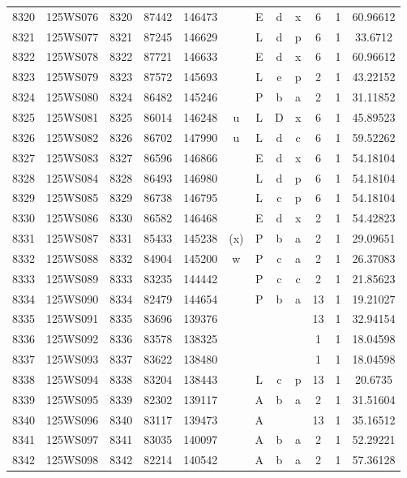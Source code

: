 \begin{tabular}{|*{12}{c|}}
8320 & 125WS076 & 8320 & 87442 & 146473 &  & E & d & x & 6 & 1 & 60.96612 \\ 
8321 & 125WS077 & 8321 & 87245 & 146629 &  & L & d & p & 6 & 1 & 33.6712 \\ 
8322 & 125WS078 & 8322 & 87721 & 146633 &  & E & d & x & 6 & 1 & 60.96612 \\ 
8323 & 125WS079 & 8323 & 87572 & 145693 &  & L & e & p & 2 & 1 & 43.22152 \\ 
8324 & 125WS080 & 8324 & 86482 & 145246 &  & P & b & a & 2 & 1 & 31.11852 \\ 
8325 & 125WS081 & 8325 & 86014 & 146248 & u & L & D & x & 6 & 1 & 45.89523 \\ 
8326 & 125WS082 & 8326 & 86702 & 147990 & u & L & d & c & 6 & 1 & 59.52262 \\ 
8327 & 125WS083 & 8327 & 86596 & 146866 &  & E & d & x & 6 & 1 & 54.18104 \\ 
8328 & 125WS084 & 8328 & 86493 & 146980 &  & L & d & p & 6 & 1 & 54.18104 \\ 
8329 & 125WS085 & 8329 & 86738 & 146795 &  & L & c & p & 6 & 1 & 54.18104 \\ 
8330 & 125WS086 & 8330 & 86582 & 146468 &  & E & d & x & 2 & 1 & 54.42823 \\ 
8331 & 125WS087 & 8331 & 85433 & 145238 & (x) & P & b & a & 2 & 1 & 29.09651 \\ 
8332 & 125WS088 & 8332 & 84904 & 145200 & w & P & c & a & 2 & 1 & 26.37083 \\ 
8333 & 125WS089 & 8333 & 83235 & 144442 &  & P & c & c & 2 & 1 & 21.85623 \\ 
8334 & 125WS090 & 8334 & 82479 & 144654 &  & P & b & a & 13 & 1 & 19.21027 \\ 
8335 & 125WS091 & 8335 & 83696 & 139376 &  &  &  &  & 13 & 1 & 32.94154 \\ 
8336 & 125WS092 & 8336 & 83578 & 138325 &  &  &  &  & 1 & 1 & 18.04598 \\ 
8337 & 125WS093 & 8337 & 83622 & 138480 &  &  &  &  & 1 & 1 & 18.04598 \\ 
8338 & 125WS094 & 8338 & 83204 & 138443 &  & L & c & p & 13 & 1 & 20.6735 \\ 
8339 & 125WS095 & 8339 & 82302 & 139117 &  & A & b & a & 2 & 1 & 31.51604 \\ 
8340 & 125WS096 & 8340 & 83117 & 139473 &  & A &  &  & 13 & 1 & 35.16512 \\ 
8341 & 125WS097 & 8341 & 83035 & 140097 &  & A & b & a & 2 & 1 & 52.29221 \\ 
8342 & 125WS098 & 8342 & 82214 & 140542 &  & A & b & a & 2 & 1 & 57.36128 \\ 

\end{tabular}
